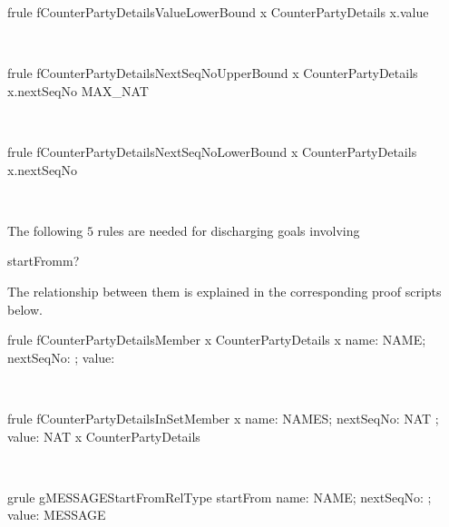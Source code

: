 \begin{LFRT}
\begin{theorem}{frule fCounterPartyDetailsValueLowerBound}
   x \in CounterPartyDetails  \leq x.value
\end{theorem}~\end{LFRT}

\begin{LFRT}
\begin{theorem}{frule fCounterPartyDetailsNextSeqNoUpperBound}
   x \in CounterPartyDetails \implies x.nextSeqNo \leq MAX\_NAT
\end{theorem}~\end{LFRT}

\begin{LFRT}
\begin{theorem}{frule fCounterPartyDetailsNextSeqNoLowerBound}
   x \in CounterPartyDetails  \leq x.nextSeqNo
\end{theorem}~\end{LFRT}
%
The following $5$ rules are needed for discharging goals involving \begin{gzed} startFrom\inv m? \end{gzed}
The relationship between them is explained in the corresponding proof scripts below.
%
\begin{LFRT}
\begin{theorem}{frule fCounterPartyDetailsMember}
    x \in  CounterPartyDetails \implies  x \in  \lblot name: NAME; nextSeqNo: \nat ; value: \nat \rblot
\end{theorem}~\end{LFRT}

\begin{LFRT}
\begin{theorem}{frule fCounterPartyDetailsInSetMember}
   x \in  \lblot name: NAMES; nextSeqNo: NAT ; value: NAT \rblot  \implies  x \in  CounterPartyDetails
\end{theorem}~\end{LFRT}

\begin{LGRT}
\begin{theorem}{grule gMESSAGEStartFromRelType}
   startFrom \in  \lblot name: NAME; nextSeqNo: \nat ; value: \nat \rblot  \rel  MESSAGE
\end{theorem}~\end{LGRT}

